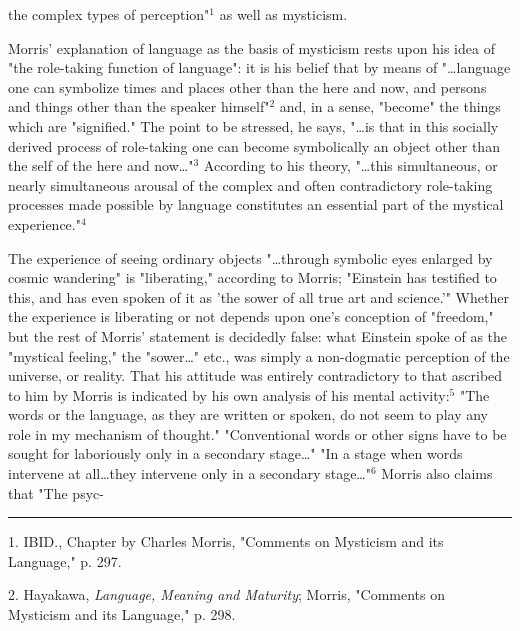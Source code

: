 \noindent the complex types of perception"$^{1}$ as well as mysticism.\par
\vspace*{0.5\baselineskip}
Morris' explanation of language as the basis of mysticism
rests upon his idea of "the role-taking function of language":
it is his belief that by means of "\dots language one can symbolize times
and places other than the here and now, and persons and things
other than the speaker himself"$^{2}$ and, in a sense, "become"
the things which are "signified." The point
to be stressed, he says, "\dots is that in this socially derived
process of role-taking one can become symbolically an object
other than the self of the here and now\dots"$^{3}$ According to
his theory, "\dots this simultaneous, or nearly simultaneous arousal
of the complex and often contradictory role-taking processes made
possible by language constitutes an essential part of the mystical
experience."$^{4}$\par
\vspace*{0.5\baselineskip}
The experience of seeing ordinary objects "\dots through
symbolic eyes enlarged by cosmic wandering" is "liberating,"
according to Morris; "Einstein has testified to this, and has
even spoken of it as 'the sower of all true art and science.'"
Whether the experience is liberating or not depends upon one's
conception of "freedom," but the rest of Morris' statement is
decidedly false: what Einstein spoke of as the "mystical feeling," the
"sower\dots" etc., was simply a non-dogmatic perception of the universe, or reality.
That his attitude was entirely contradictory to that ascribed to him by Morris is indicated
by his own analysis of his mental activity:$^{5}$
"The words or the language, as they are written or spoken,
do not seem to play any role in my mechanism of thought."
"Conventional words or other signs have to be sought for laboriously only
in a secondary stage\dots" "In a stage when words intervene at all\dots they intervene only in a secondary
stage\dots"$^{6}$ Morris also claims that "The psyc-\linebreak
\null\par
\vspace*{-\baselineskip}
\vspace*{\fill}
\noindent\rule{0.25\textwidth}{0.4pt}\par
1. IBID., Chapter by Charles Morris, "Comments on Mysticism and its Language," p. 297.\par
2. Hayakawa, \textit{Language, Meaning and Maturity}; Morris, "Comments on Mysticism and its Language," p. 298.\par
